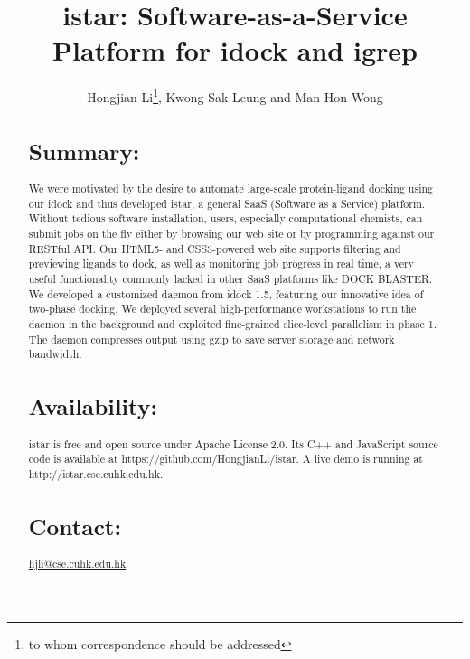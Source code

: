\documentclass{bioinfo}
\begin{document}

\title[istar]{istar: Software-as-a-Service Platform for idock and igrep}
\author[Hongjian Li \textit{et~al}]{Hongjian Li\footnote{to whom correspondence should be addressed}, Kwong-Sak Leung and Man-Hon Wong}
\address{Department of Computer Science and Engineering, Chinese University of Hong Kong, Shatin, New Territories, Hong Kong, China}



\maketitle

\begin{abstract}
\section{Summary:}
We were motivated by the desire to automate large-scale protein-ligand docking using our idock and thus developed istar, a general SaaS (Software as a Service) platform. Without tedious software installation, users, especially computational chemists, can submit jobs on the fly either by browsing our web site or by programming against our RESTful API. Our HTML5- and CSS3-powered web site supports filtering and previewing ligands to dock, as well as monitoring job progress in real time, a very useful functionality commonly lacked in other SaaS platforms like DOCK BLASTER. We developed a customized daemon from idock 1.5, featuring our innovative idea of two-phase docking. We deployed several high-performance workstations to run the daemon in the background and exploited fine-grained slice-level parallelism in phase 1. The daemon compresses output using gzip to save server storage and network bandwidth.

\section{Availability:}
istar is free and open source under Apache License 2.0. Its C++ and JavaScript source code is available at https://github.com/HongjianLi/istar. A live demo is running at http://istar.cse.cuhk.edu.hk.

\section{Contact:} \href{hjli@cse.cuhk.edu.hk}{hjli@cse.cuhk.edu.hk}
\end{abstract}
\end{document}
